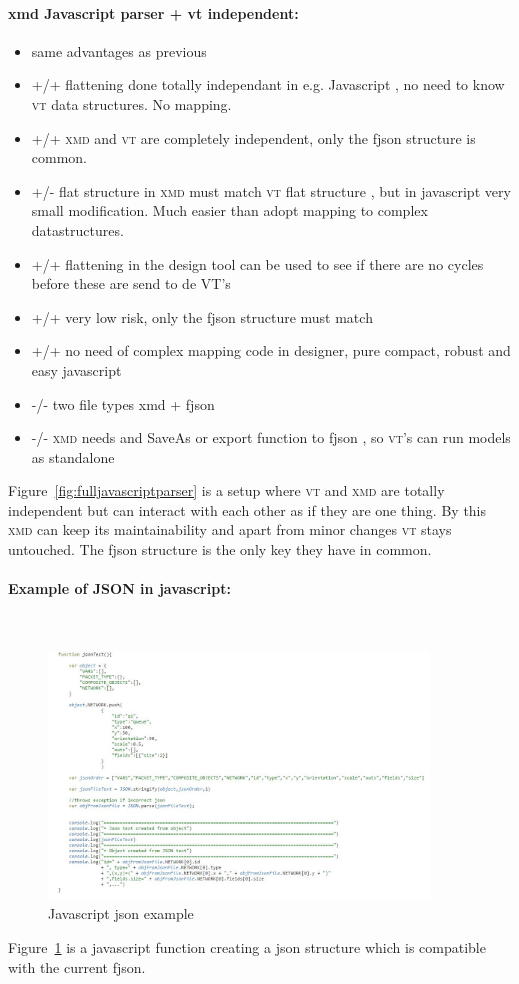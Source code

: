 \documentclass[a4paper,11pt,final]{article}
\newcommand{\xmd}{\textsc{xmd}\xspace}%
\newcommand{\vt}{\textsc{vt}\xspace}%
\begin{document}
\paragraph{xmd Javascript parser + vt independent:}
\begin{itemize}
\item same advantages as previous
\item +/+ flattening done totally independant in e.g. Javascript , no need to know \vt 
		data structures.  No mapping.
\item +/+ \xmd and \vt are completely independent, only the fjson structure is common.
\item +/- flat structure in \xmd must match \vt flat structure , but in javascript
	very small modification. Much easier than adopt mapping to complex datastructures.
\item +/+ flattening in the design tool can be used to see if there are no cycles before these are send to de VT’s
\item +/+ very low risk, only the fjson structure must match
\item +/+ no need of complex mapping code in designer, pure compact, robust and easy javascript
\item -/- two file types xmd + fjson
\item -/- \xmd needs and SaveAs or export function to fjson , so \vt’s can run models as standalone
\end{itemize}


Figure~\ref{fig:fulljavascriptparser} is a setup where \vt and \xmd are totally independent
but can interact with each other as if they are one thing. By this \xmd can keep
its maintainability and apart from minor changes \vt stays untouched.
The fjson structure is the only key they have in common.

\paragraph{Example of JSON in javascript:}\

\begin{figure}[here]
\includegraphics[width=0.90\textwidth]{js_json}
\caption{Javascript json example}
\label{fig:js_json}
\end{figure}
Figure~\ref{fig:js_json} is a javascript function creating a json structure
which is compatible with the current fjson.
\end{document}
